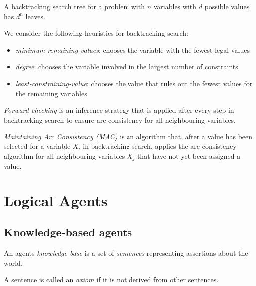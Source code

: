 \documentclass{article}
\begin{document}
\begin{lemma}
    A backtracking search tree for a problem with $n$ variables with $d$ possible values
    has $d^n$ leaves.
\end{lemma}

\begin{definition}
    We consider the following heuristics for backtracking search:
    \begin{itemize}
        \item \emph{minimum-remaining-values}: chooses the variable with the fewest legal values
        \item \emph{degree}: chooses the variable involved in the largest number of constraints
        \item \emph{least-constraining-value}: chooses the value that
        rules out the fewest values for the remaining variables
    \end{itemize}
\end{definition}

\begin{definition}
    \emph{Forward checking} is an inference strategy that is applied after every
    step in backtracking search to ensure arc-consistency for all neighbouring variables.
\end{definition}

\begin{definition}
    \emph{Maintaining Arc Consistency (MAC)} is an algorithm that, after a value has
    been selected for a variable $X_i$ in backtracking search, applies the arc
    consistency algorithm for all neighbouring variables $X_j$ that have not yet
    been assigned a value.
\end{definition}

\section{Logical Agents}

\subsection{Knowledge-based agents}

\begin{definition}
    An agents \emph{knowledge base} is a set of \emph{sentences} representing assertions
    about the world.
\end{definition}

\begin{definition}
    A sentence is called an \emph{axiom} if it is not derived from other sentences.
\end{definition}
\end{document}

